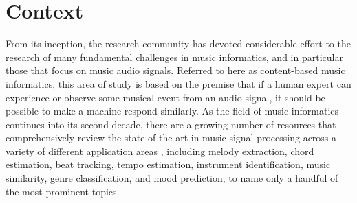 

\graphicspath{{2/figures/}}

\chapter{Context}
\label{chp:context}


From its inception, the research community has devoted considerable effort to the research of many fundamental challenges in music informatics, and in particular those that focus on music audio signals.
Referred to here as content-based music informatics, this area of study is based on the premise that if a human expert can experience or observe some musical event from an audio signal, it should be possible to make a machine respond similarly.
As the field of music informatics continues into its second decade, there are a growing number of resources that comprehensively review the state of the art in music signal processing across a variety of different application areas \cite{Klapuri2006Signal,Casey2008Content,Mueller2011Signal}, including melody extraction, chord estimation, beat tracking, tempo estimation, instrument identification, music similarity, genre classification, and mood prediction, to name only a handful of the most prominent topics.

